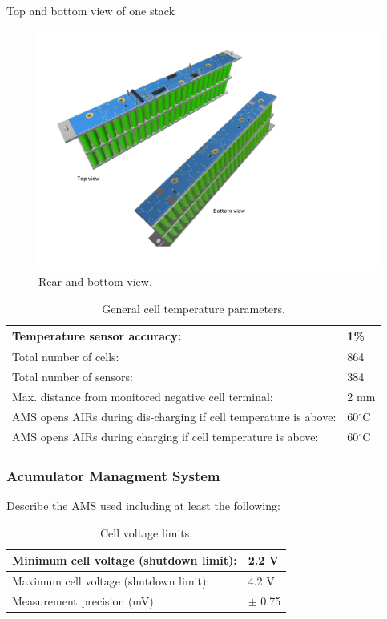 Top and bottom view of one stack 
\begin{figure}[H]
	\centering
	\includegraphics[width=\textwidth]{./img/BMS-top-andbottom.pdf}
	\caption{Rear and bottom view.}
	\label{fig:torque1}
\end{figure}

\begin{table}[H]
	\centering
	\caption{General cell temperature parameters.}
	\begin{tabularx}{\textwidth}{|X|X|}
		\hline
		Temperature sensor accuracy: & 1\% \\[\TableSize]
		\hline
		Total number of cells: & 864 \\[\TableSize]
		\hline
		Total number of sensors: &  384 \\[\TableSize]
		\hline
		Max. distance from monitored negative cell terminal: & 2 mm \\[\TableSize]
		\hline
		AMS opens AIRs during dis-charging if cell temperature is above: & 60$^\circ$C \\[\TableSize]
		\hline
		AMS opens AIRs during charging if cell temperature is above: & 60$^\circ$C \\[\TableSize]
		\hline
	\end{tabularx}%
	\label{tab:acc-temp}%
\end{table}%

\subsubsection{Acumulator Managment System}
Describe the AMS used including at least the following:

\begin{table}[H]
	\centering
	\caption{Cell voltage limits.}
	\begin{tabularx}{\textwidth}{|X|X|}
		\hline
		Minimum cell voltage (shutdown limit): & 2.2 V \\[\TableSize]
		\hline
		Maximum cell voltage (shutdown limit): & 4.2 V \\[\TableSize]
		\hline
		Measurement precision (mV): & $\pm$ 0.75 \\[\TableSize]
		\hline
	\end{tabularx}%
	\label{tab:acc-limits}%
\end{table}%

